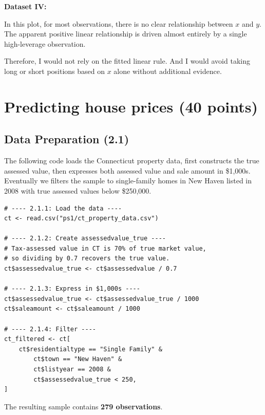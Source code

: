 \documentclass[11pt]{article}
\begin{document}
\vspace{1em}

\noindent\textbf{Dataset IV:}

In this plot, for most observations, there is no clear relationship between $x$ and $y$. The apparent positive linear relationship is driven almost entirely by a single high-leverage observation.

Therefore, I would not rely on the fitted linear rule. And I would avoid taking long or short positions based on $x$ alone without additional evidence.

\section{Predicting house prices (40 points)}

\subsection{Data Preparation (2.1)}

The following code loads the Connecticut property data, first constructs the
true assessed value, then expresses both assessed value and sale amount in
\$1,000s. Eventually we filters the sample to single-family homes in New Haven
listed in 2008 with true assessed values below \$250,000.

\vspace{0.5em}

\begin{lstlisting}[style=rcode]
# ---- 2.1.1: Load the data ----
ct <- read.csv("ps1/ct_property_data.csv")

# ---- 2.1.2: Create assessedvalue_true ----
# Tax-assessed value in CT is 70% of true market value,
# so dividing by 0.7 recovers the true value.
ct$assessedvalue_true <- ct$assessedvalue / 0.7

# ---- 2.1.3: Express in $1,000s ----
ct$assessedvalue_true <- ct$assessedvalue_true / 1000
ct$saleamount <- ct$saleamount / 1000

# ---- 2.1.4: Filter ----
ct_filtered <- ct[
    ct$residentialtype == "Single Family" &
        ct$town == "New Haven" &
        ct$listyear == 2008 &
        ct$assessedvalue_true < 250,
]
\end{lstlisting}

\vspace{0.5em}

The resulting sample contains \textbf{279 observations}.

\end{document}
